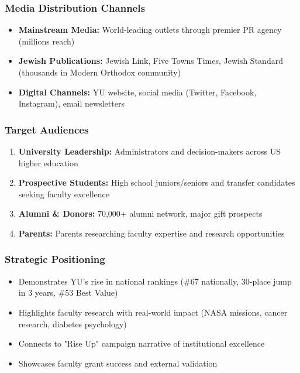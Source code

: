 \documentclass[12pt,letterpaper]{article}
\begin{document}
\subsubsection{Media Distribution Channels}
\begin{itemize}[leftmargin=*]
    \item \textbf{Mainstream Media:} World-leading outlets through premier PR agency (millions reach)
    \item \textbf{Jewish Publications:} Jewish Link, Five Towns Times, Jewish Standard (thousands in Modern Orthodox community)
    \item \textbf{Digital Channels:} YU website, social media (Twitter, Facebook, Instagram), email newsletters
\end{itemize}

\subsubsection{Target Audiences}
\begin{enumerate}[leftmargin=*]
    \item \textbf{University Leadership:} Administrators and decision-makers across US higher education
    \item \textbf{Prospective Students:} High school juniors/seniors and transfer candidates seeking faculty excellence
    \item \textbf{Alumni \& Donors:} 70,000+ alumni network, major gift prospects
    \item \textbf{Parents:} Parents researching faculty expertise and research opportunities
\end{enumerate}

\subsubsection{Strategic Positioning}
\begin{itemize}[leftmargin=*]
    \item Demonstrates YU's rise in national rankings (\#67 nationally, 30-place jump in 3 years, \#53 Best Value)
    \item Highlights faculty research with real-world impact (NASA missions, cancer research, diabetes psychology)
    \item Connects to "Rise Up" campaign narrative of institutional excellence
    \item Showcases faculty grant success and external validation
\end{itemize}
\end{document}
